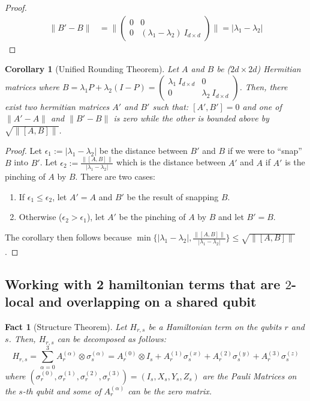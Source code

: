 \documentclass[12pt]{article}
\theoremstyle{plain}
\newtheorem{corollary}[theorem]{Corollary}
\newtheorem{fact}[theorem]{Fact}
\begin{document}
\begin{proof}
\begin{align*}
\|B' - B \| &= \|\begin{pmatrix}
        0 & 0\\ 0 & \left(\lambda_1 - \lambda_2\right)\: I_{d \times d}
    \end{pmatrix}\| = |\lambda_1 - \lambda_2|
\end{align*}
\end{proof}

\begin{corollary}[Unified Rounding Theorem]
    Let $A$ and $B$ be ($2d \times 2d$) Hermitian matrices where $B = \lambda_1 P + \lambda_2 (I - P) = \begin{pmatrix}
        \lambda_1\: I_{d \times d} & 0\\ 0 & \lambda_2\: I_{d \times d}
    \end{pmatrix}$. Then, there exist two hermitian matrices $A'$ and $B'$ such that: $[A', B'] = 0$ and one of $\|A' - A\|$ and $\|B' - B \|$ is zero while the other is bounded above by $\sqrt{\|[A, B]\|}$.
\end{corollary}
\begin{proof}
    Let $\epsilon_1 := |\lambda_1 - \lambda_2|$ be the distance between $B'$ and $B$ if we were to ``snap'' $B$ into $B'$. Let $\epsilon_2 := \frac{\|[A, B]\|}{|\lambda_1 - \lambda_2|}$ which is the distance between $A'$ and $A$ if $A'$ is the pinching of $A$ by $B$.
    There are two cases:
    \begin{enumerate}
        \item If $\epsilon_1 \leq \epsilon_2$, let $A' = A$ and $B'$ be the result of snapping $B$.
        \item Otherwise ($\epsilon_2 > \epsilon_1$), let $A'$ be the pinching of $A$ by $B$ and let $B' = B$.
    \end{enumerate}
    The corollary then follows because $\min\{|\lambda_1 - \lambda_2|, \frac{\|[A, B]\|}{|\lambda_1 - \lambda_2|}\} \leq \sqrt{\|[A, B]\|}$.
\end{proof}

\subsection{Working with 2 hamiltonian terms that are $2$-local and overlapping on a shared qubit}

\begin{fact}[Structure Theorem]
    Let $H_{r,s}$ be a Hamiltonian term on the qubits $r$ and $s$. Then, $H_{r,s}$ can be decomposed as follows:
    \begin{equation}
        H_{r,s} = \sum\limits_{\alpha = 0}^{3} A_r^{(\alpha)} \otimes \sigma_s^{(\alpha)} = A_r^{(0)} \otimes I_s + A_r^{(1)} \sigma_s^{(x)} + A_r^{(2)} \sigma_s^{(y)} + A_r^{(3)} \sigma_s^{(z)}
    \end{equation}
where $\left(\sigma_r^{(0)}, \sigma_r^{(1)}, \sigma_r^{(2)}, \sigma_r^{(3)}\right) = \left(I_s, X_s, Y_s, Z_s\right)$ are the Pauli Matrices on the $s$-th qubit and some of $A_r^{(\alpha)}$ can be the zero matrix.
\end{fact}
\end{document}
